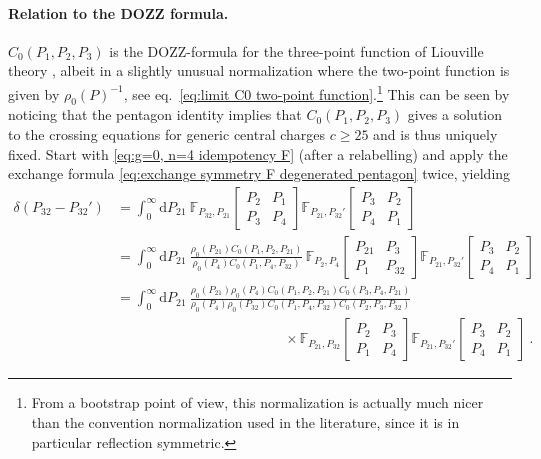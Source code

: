 \documentclass[12pt,a4paper]{article}
\begin{document}
\paragraph{Relation to the DOZZ formula.} $C_0(P_1,P_2, P_3)$ is the DOZZ-formula for the three-point function of Liouville theory \cite{Dorn:1994xn, Zamolodchikov:1995aa}, albeit in a slightly unusual normalization where the two-point function is given by $\rho_0(P)^{-1}$, see eq.~\eqref{eq:limit C0 two-point function}.\footnote{From a bootstrap point of view, this normalization is actually much nicer than the convention normalization used in the literature, since it is in particular reflection symmetric.} This can be seen by noticing that the pentagon identity implies that $C_0(P_1,P_2,P_3)$ gives a solution to the crossing equations for generic central charges $c \ge 25$ and is thus uniquely fixed. 
Start with \eqref{eq:g=0, n=4 idempotency F} (after a relabelling) and apply the exchange formula \eqref{eq:exchange symmetry F degenerated pentagon} twice, yielding
\begin{align}
    \delta(P_{32}-P_{32}')&=\int_0^\infty\!\! \mathrm{d}P_{21}\ \mathbb{F}_{P_{32},P_{21}}\!\begin{bmatrix}
P_2 & P_1 \\
P_3 & P_4
\end{bmatrix}
\mathbb{F}_{P_{21},P_{32}'}\!\begin{bmatrix}
P_3 & P_2 \\
P_4 & P_1
\end{bmatrix} \\
&=\int_0^\infty\!\! \mathrm{d}P_{21}\ \frac{\rho_0(P_{21}) C_0(P_1,P_2,P_{21})}{\rho_0(P_4)C_0(P_1,P_4,P_{32})}\, \mathbb{F}_{P_2,P_4}\!\begin{bmatrix}
P_{21} & P_3 \\
P_1 & P_{32}
\end{bmatrix}
\mathbb{F}_{P_{21},P_{32}'}\!\begin{bmatrix}
P_3 & P_2 \\
P_4 & P_1
\end{bmatrix} \\
&=\int_0^\infty\!\! \mathrm{d}P_{21}\ \frac{\rho_0(P_{21})\rho_0(P_4) C_0(P_1,P_2,P_{21}) C_0(P_3,P_4,P_{21})}{\rho_0(P_4)\rho_0(P_{32})C_0(P_1,P_4,P_{32})C_0(P_2,P_3,P_{32})}\nonumber\\
&\qquad\qquad\qquad\qquad\qquad\qquad\times \mathbb{F}_{P_{21},P_{32}}\!\begin{bmatrix}
P_2 & P_3 \\
P_1 & P_4
\end{bmatrix}
\mathbb{F}_{P_{21},P_{32}'}\!\begin{bmatrix}
P_3 & P_2 \\
P_4 & P_1
\end{bmatrix} \ .
\end{align}
\end{document}
